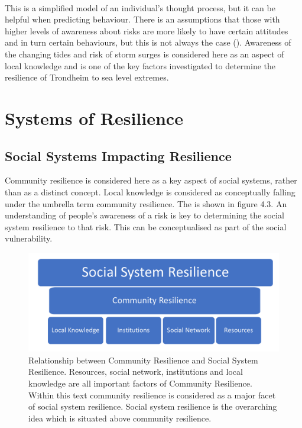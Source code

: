 \paragraph{}
This is a simplified model of an individual's thought process, but it can be helpful when predicting behaviour. There is an assumptions that those with higher levels of awareness about risks are more likely to have certain attitudes and in turn certain behaviours, but this is not always the case (\cite{lujala_climate_2015}).  Awareness of the changing tides and risk of storm surges is considered here as an aspect of local knowledge and is one of the key factors investigated to determine the resilience of Trondheim to sea level extremes. 

\section{Systems of Resilience }

\subsection{Social Systems Impacting Resilience}
Community resilience is considered here as a key aspect of social systems, rather than as a distinct concept. Local knowledge is considered as conceptually falling under the umbrella term community resilience. The is shown in figure 4.3. An understanding of people's awareness of a risk is key to determining the social system resilience to that risk. This can be conceptualised as part of the social vulnerability.


\begin{figure}[h]
    \centering
    \includegraphics[width=1\textwidth]{fig_theory/social system hierarchy.png}
    \caption{Relationship between Community Resilience and Social System Resilience. Resources, social network, institutions and local knowledge are all important factors of Community Resilience. Within this text community resilience is considered as a major facet of social system resilience. Social system resilience is the overarching idea which is situated above community resilience.}
    \label{fig:social_resilience}
\end{figure}
